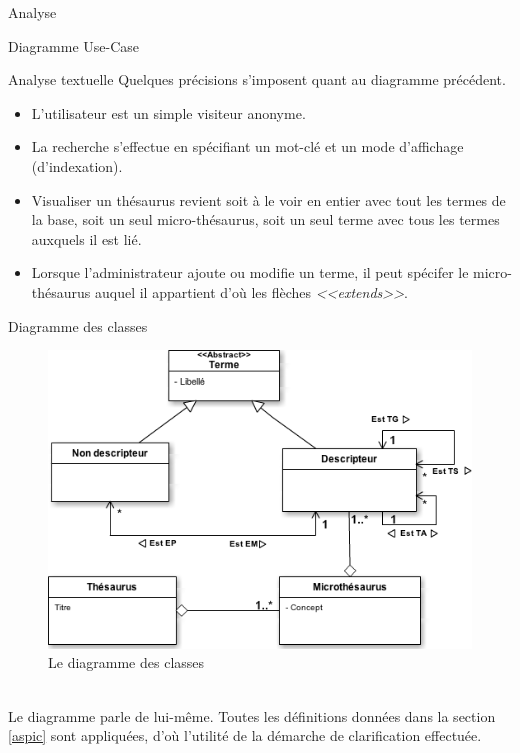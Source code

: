 \documentclass[a4paper, 12pt]{report}
\begin{document}
\begin{chapter}{Analyse}
\begin{section}{Diagramme Use-Case}
		\begin{subsection}{Analyse textuelle}
			Quelques précisions s'imposent quant au diagramme précédent.\\
			\begin{itemize}
				\item L'utilisateur est un simple visiteur anonyme.
				\item La recherche s'effectue en spécifiant un mot-clé et un mode d'affichage (d'indexation).
				\item Visualiser un thésaurus revient soit à le voir en entier avec tout les termes de la base,
					soit un seul micro-thésaurus, soit un seul terme avec tous les termes auxquels il est lié.
				\item Lorsque l'administrateur ajoute ou modifie un terme, il peut spécifer le micro-thésaurus auquel il appartient d'où les flèches \emph{<<extends>>}.
			\end{itemize}
		\end{subsection}
	\end{section}
	
	\begin{section}{Diagramme des classes}
		\begin{figure}[h]
			\label{classeur}
			\begin{center}
				\includegraphics[width=13cm]{Classes.png}
				\caption{Le diagramme des classes}
			\end{center}
		\end{figure}~\\
		
		Le diagramme parle de lui-même. Toutes les définitions données dans la section \ref{aspic} sont appliquées, d'où l'utilité de la démarche de clarification
		effectuée.\\
	\end{section}
\end{chapter}
\end{document}
